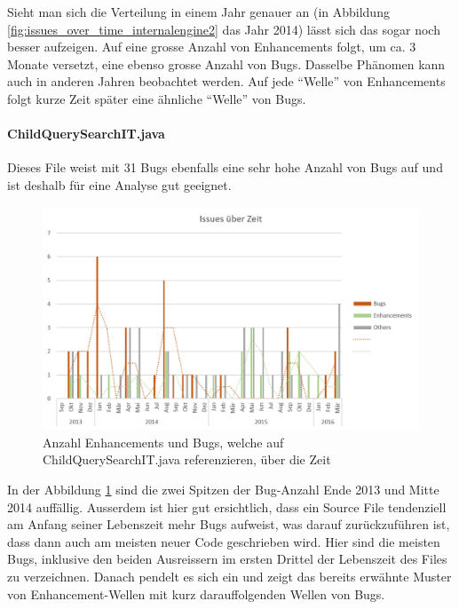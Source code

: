 \documentclass[10pt, a4paper]{article}
\begin{document}
Sieht man sich die Verteilung in einem Jahr genauer an (in Abbildung \ref{fig:issues_over_time_internalengine2} das Jahr 2014) lässt sich das sogar noch besser aufzeigen. Auf eine grosse Anzahl von Enhancements folgt, um ca. 3 Monate versetzt, eine ebenso grosse Anzahl von Bugs. Dasselbe Phänomen kann auch in anderen Jahren beobachtet werden. Auf jede ``Welle'' von Enhancements folgt kurze Zeit später eine ähnliche ``Welle'' von Bugs.

\paragraph{ChildQuerySearchIT.java} Dieses File weist mit 31 Bugs ebenfalls eine sehr hohe Anzahl von Bugs auf und ist deshalb für eine Analyse gut geeignet.

\begin{figure}[!ht]
	\centering
	\includegraphics[width=1\textwidth]{resources/images/issues_over_time_childquerysearch.png}
	\caption{Anzahl Enhancements und Bugs, welche auf ChildQuerySearchIT.java referenzieren, über die Zeit}
	\label{fig:issues_over_time_childquerysearch}
\end{figure}

In der Abbildung \ref{fig:issues_over_time_childquerysearch} sind die zwei Spitzen der Bug-Anzahl Ende 2013 und Mitte 2014 auffällig. Ausserdem ist hier gut ersichtlich, dass ein Source File tendenziell am Anfang seiner Lebenszeit mehr Bugs aufweist, was darauf zurückzuführen ist, dass dann auch am meisten neuer Code geschrieben wird. Hier sind die meisten Bugs, inklusive den beiden Ausreissern im ersten Drittel der Lebenszeit des Files zu verzeichnen. Danach pendelt es sich ein und zeigt das bereits erwähnte Muster von Enhancement-Wellen mit kurz darauffolgenden Wellen von Bugs.
\end{document}
